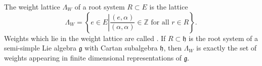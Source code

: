 \documentclass[12pt]{article}
\begin{document}
The weight lattice $\Lambda_W$ of a root system $R\subset E$ is the lattice $$\Lambda_W=\left\{ e\in E \left| \frac{(e,\alpha)}{(\alpha,\alpha)}\in\mathbb{Z} \text{ for all } r\in R \right. \right\} .$$  Weights which lie in the weight lattice are called {\em {}}. If $R\subset\mathfrak{h}$ is the root system of a semi-simple Lie algebra $\mathfrak{g}$ with Cartan subalgebra $\mathfrak{h}$, then $\Lambda_W$ is exactly the set of weights appearing in finite dimensional representations of $\mathfrak{g}$.
\end{document}
